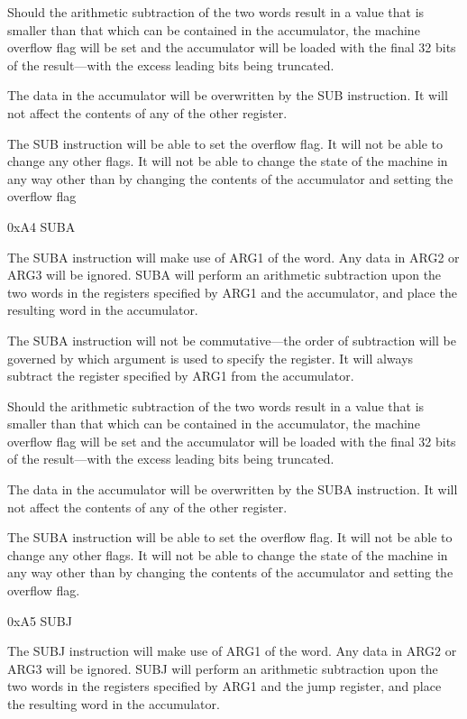 \documentclass[]{article}
\begin{document}
Should the arithmetic subtraction of the two words result in a value
that is smaller than that which can be contained in the accumulator, the
machine overflow flag will be set and the accumulator will be loaded
with the final 32 bits of the result---with the excess leading bits
being truncated.~

The data in the accumulator will be overwritten by the SUB instruction.
It will not affect the contents of any of the other register.~

The SUB instruction will be able to set the overflow flag. It will not
be able to change any other flags. It will not be able to change the
state of the machine in any way other than by changing the contents of
the accumulator and setting the overflow flag

0xA4 SUBA

The SUBA instruction will make use of ARG1 of the word. Any data in ARG2
or ARG3 will be ignored. SUBA will perform an arithmetic subtraction
upon the two words in the registers specified by ARG1 and the
accumulator, and place the resulting word in the accumulator.

The SUBA instruction will not be commutative---the order of subtraction
will be governed by which argument is used to specify the register. It
will always subtract the register specified by ARG1 from the
accumulator.

Should the arithmetic subtraction of the two words result in a value
that is smaller than that which can be contained in the accumulator, the
machine overflow flag will be set and the accumulator will be loaded
with the final 32 bits of the result---with the excess leading bits
being truncated.~

The data in the accumulator will be overwritten by the SUBA instruction.
It will not affect the contents of any of the other register.~

The SUBA instruction will be able to set the overflow flag. It will not
be able to change any other flags. It will not be able to change the
state of the machine in any way other than by changing the contents of
the accumulator and setting the overflow flag.

0xA5 SUBJ

The SUBJ instruction will make use of ARG1 of the word. Any data in ARG2
or ARG3 will be ignored. SUBJ will perform an arithmetic subtraction
upon the two words in the registers specified by ARG1 and the jump
register, and place the resulting word in the accumulator.
\end{document}
